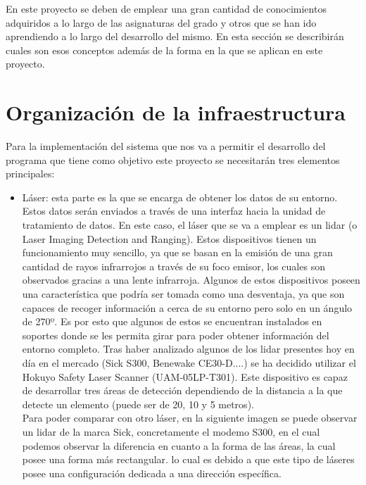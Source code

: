 \textit{}

En este proyecto se deben de emplear una gran cantidad de  conocimientos adquiridos a lo largo de las asignaturas del grado y otros que se han ido aprendiendo a lo largo del desarrollo del mismo. En esta sección se describirán cuales son esos conceptos además de la forma en la que se aplican en este proyecto.

\section{Organización de la infraestructura}

Para la implementación del sistema que nos va a permitir el desarrollo del programa que tiene como objetivo este proyecto se necesitarán tres elementos principales:
\begin{itemize}
	 \item Láser: esta parte es la que se encarga de obtener los datos de su entorno. Estos datos serán enviados a través de una interfaz hacia la unidad de tratamiento de datos.  En este caso, el láser que se va a emplear es un lidar (o Laser Imaging Detection and Ranging). Estos dispositivos tienen un funcionamiento muy sencillo, ya que se basan en la emisión de una gran cantidad de rayos infrarrojos a través de su foco emisor, los cuales son observados gracias a una lente infrarroja. Algunos de estos dispositivos poseen una característica que podría ser tomada como una desventaja, ya que son capaces de recoger información a cerca de su entorno pero solo en un ángulo de 270º. Es por esto que algunos de estos se encuentran instalados en soportes donde se les permita girar para poder obtener información del entorno completo. Tras haber analizado algunos de los lidar presentes hoy en día en el mercado (Sick S300, Benewake CE30-D....) se ha decidido utilizar el Hokuyo Safety Laser Scanner (UAM-05LP-T301). Este dispositivo es capaz de desarrollar tres áreas de detección dependiendo de la distancia a la que detecte un elemento (puede ser de 20, 10 y 5 metros).\\
	 Para poder comparar con otro láser, en la siguiente imagen se puede observar un lidar de la marca Sick, concretamente el modemo S300, en el cual podemos observar la diferencia en cuanto a la forma de las áreas, la cual posee una forma más rectangular. lo cual es debido a que este tipo de láseres posee una configuración dedicada a una dirección específica.

\end{itemize}
